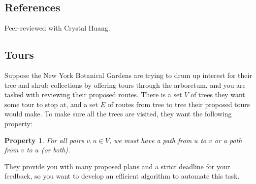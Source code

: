 \def\lc{\left\lceil}   
\def\rc{\right\rceil}
\newtheorem{claim}{Claim}
\newtheorem{property}{Property}
\runningheadrule
\firstpageheadrule
\cfoot{}
\subsection*{References}
Peer-reviewed with Crystal Huang.
\subsection{Tours}
Suppose the New York Botanical Gardens are trying to drum up interest for their tree and shrub collections by offering tours through the arboretum, and you are tasked with reviewing their proposed routes. There is a set $V$ of trees they want some tour to stop at, and a set $E$ of routes from tree to tree their proposed tours would make. To make sure all the trees are visited, they want the following property:
\begin{property} 
For all pairs $v, u\in V$, we must have a path from $u$ to $v$ or a path from $v$ to $u$ (or both). 
\end{property}
\noindent They provide you with many proposed plans and a strict deadline for your feedback, so you want to develop an efficient algorithm to automate this task. 


